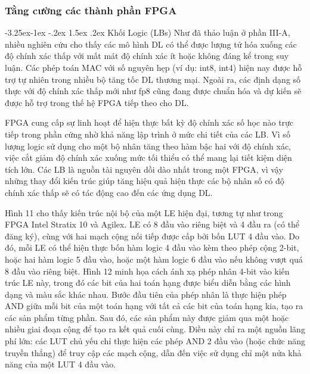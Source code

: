 \documentclass[a4paper]{article}
\makeatletter
\newcounter {subsubsubsection}[subsubsection]
\newcommand\subsubsubsection{\@startsection{subsubsubsection}{4}{\z@}%
                                     {-3.25ex\@plus -1ex \@minus -.2ex}%
                                     {1.5ex \@plus .2ex}%
                                     {\normalfont\normalsize\bfseries}}
\makeatother
\begin{document}
\subsubsection{Tằng cường các thành phần FPGA}
\subsubsubsection{Khối Logic (LBs)}
Như đã thảo luận ở phần III-A, nhiều nghiên cứu cho thấy các mô hình DL có thể được lượng tử hóa xuống các độ chính xác thấp với mất mát độ chính xác ít hoặc không đáng kể trong suy luận. Các phép toán MAC với số nguyên hẹp (ví dụ: int8, int4) hiện nay được hỗ trợ tự nhiên trong nhiều bộ tăng tốc DL thương mại. Ngoài ra, các định dạng số thực với độ chính xác thấp mới như fp8 cũng đang được chuẩn hóa và dự kiến sẽ được hỗ trợ trong thế hệ FPGA tiếp theo cho DL.

FPGA cung cấp sự linh hoạt để hiện thực bất kỳ độ chính xác số học nào trực tiếp trong phần cứng nhờ khả năng lập trình ở mức chi tiết của các LB. Vì số lượng logic sử dụng cho một bộ nhân tăng theo hàm bậc hai với độ chính xác, việc cắt giảm độ chính xác xuống mức tối thiểu có thể mang lại tiết kiệm diện tích lớn. Các LB là nguồn tài nguyên dồi dào nhất trong một FPGA, vì vậy những thay đổi kiến trúc giúp tăng hiệu quả hiện thực các bộ nhân số có độ chính xác thấp sẽ có tác động cao đến các ứng dụng DL.

Hình 11 cho thấy kiến trúc nội bộ của một LE hiện đại, tương tự như trong FPGA Intel Stratix 10 và Agilex. LE có 8 đầu vào riêng biệt và 4 đầu ra (có thể đăng ký), cùng với hai mạch cộng nối tiếp được cấp bởi bốn LUT 4 đầu vào. Do đó, mỗi LE có thể hiện thực bốn hàm logic 4 đầu vào kèm theo phép cộng 2-bit, hoặc hai hàm logic 5 đầu vào, hoặc một hàm logic 6 đầu vào nếu không vượt quá 8 đầu vào riêng biệt. Hình 12 minh họa cách ánh xạ phép nhân 4-bit vào kiến trúc LE này, trong đó các bit của hai toán hạng được biểu diễn bằng các hình dạng và màu sắc khác nhau. Bước đầu tiên của phép nhân là thực hiện phép AND giữa mỗi bit của một toán hạng với tất cả các bit của toán hạng kia, tạo ra các sản phẩm từng phần. Sau đó, các sản phẩm này được giảm qua một hoặc nhiều giai đoạn cộng để tạo ra kết quả cuối cùng. Điều này chỉ ra một nguồn lãng phí lớn: các LUT chủ yếu chỉ thực hiện các phép AND 2 đầu vào (hoặc chức năng truyền thẳng) để truy cập các mạch cộng, dẫn đến việc sử dụng chỉ một nửa khả năng của một LUT 4 đầu vào.
\end{document}
